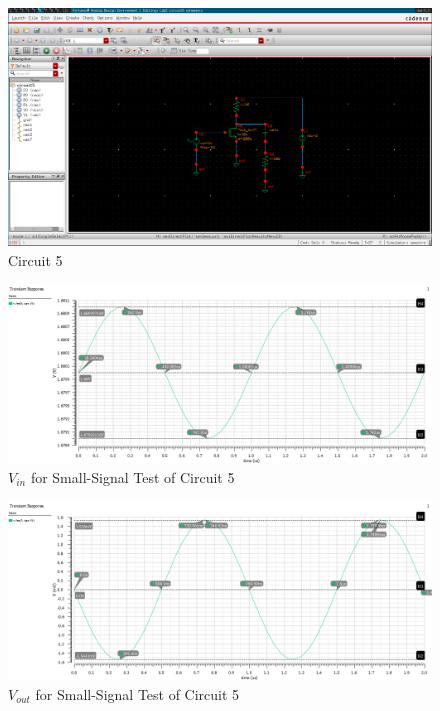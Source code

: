 \FloatBarrier

\begin{figure}[h!]
	\centering
	\includegraphics[scale=0.45]{../images/circuit5.PNG}
	\caption{Circuit 5}
	\label{fig:circuit5}
\end{figure}

\FloatBarrier

\FloatBarrier

\begin{figure}[h!]
	\centering
	\includegraphics[scale=0.45]{../images/sim5_vin.PNG}
	\caption{$V_{in}$ for Small-Signal Test of Circuit 5}
	\label{fig:sim5_vin}
\end{figure}

\FloatBarrier

\FloatBarrier

\begin{figure}[h!]
	\centering
	\includegraphics[scale=0.45]{../images/sim5_vout.PNG}
	\caption{$V_{out}$ for Small-Signal Test of Circuit 5}
	\label{fig:sim5_vout}
\end{figure}

